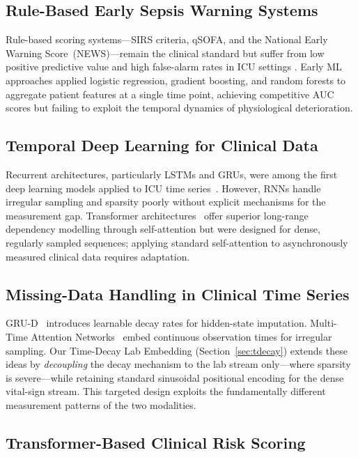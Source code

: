 \documentclass[conference,12pt]{IEEEtran}
\newcommand{\sect}[1]{Section~\ref{#1}}
\begin{document}
\subsection{\textbf{Rule-Based Early Sepsis Warning Systems}}
\label{sec:rel:rules}

Rule-based scoring systems---SIRS criteria, qSOFA, and the National Early
Warning Score~(NEWS)---remain the clinical standard but suffer from low
positive predictive value and high false-alarm rates in ICU settings
\cite{serafim2018}.
Early ML approaches applied logistic regression, gradient boosting, and random
forests to aggregate patient features at a single time point, achieving
competitive AUC scores but failing to exploit the temporal dynamics of
physiological deterioration.

\subsection{\textbf{Temporal Deep Learning for Clinical Data}}
\label{sec:rel:dl}

Recurrent architectures, particularly LSTMs and GRUs, were among the first deep
learning models applied to ICU time series~\cite{che2018}.
However, RNNs handle irregular sampling and sparsity poorly without explicit
mechanisms for the measurement gap.
Transformer architectures~\cite{vaswani2017} offer superior long-range
dependency modelling through self-attention but were designed for dense,
regularly sampled sequences; applying standard self-attention to asynchronously
measured clinical data requires adaptation.

\subsection{\textbf{Missing-Data Handling in Clinical Time Series}}
\label{sec:rel:missing}

GRU-D~\cite{che2018} introduces learnable decay rates for hidden-state
imputation.
Multi-Time Attention Networks~\cite{shukla2021} embed continuous observation
times for irregular sampling.
Our Time-Decay Lab Embedding (\sect{sec:tdecay}) extends these ideas by
\emph{decoupling} the decay mechanism to the lab stream only---where sparsity
is severe---while retaining standard sinusoidal positional encoding for the
dense vital-sign stream.
This targeted design exploits the fundamentally different measurement patterns
of the two modalities.

\subsection{\textbf{Transformer-Based Clinical Risk Scoring}}
\label{sec:rel:transformers}
\end{document}
